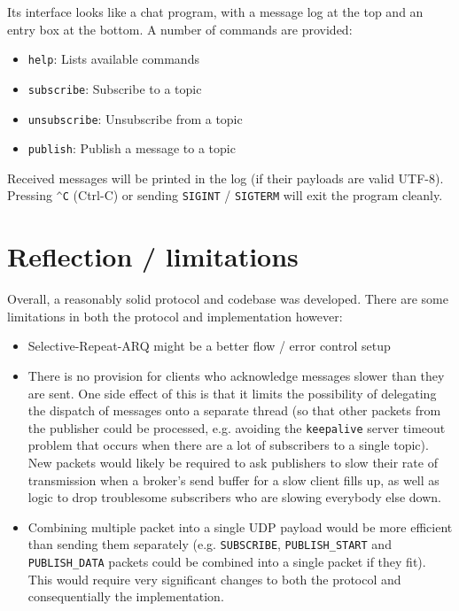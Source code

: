 \documentclass[a4paper]{article}
\numberwithin{figure}{section}
\numberwithin{table}{section}
\newcommand{\mi}{\mintinline}
\begin{document}
Its interface looks like a chat program, with a message log at the top and an entry box at the bottom. A number of commands are provided:
\begin{itemize}
	\item \mi{c}{help}: Lists available commands
	\item \mi{c}{subscribe}: Subscribe to a topic
	\item \mi{c}{unsubscribe}: Unsubscribe from a topic
	\item \mi{c}{publish}: Publish a message to a topic
\end{itemize}

Received messages will be printed in the log (if their payloads are valid UTF-8). Pressing \mi{c}{^C} (Ctrl-C) or sending \mi{c}{SIGINT} / \mi{c}{SIGTERM} will exit the program cleanly.

\section{Reflection / limitations}
Overall, a reasonably solid protocol and codebase was developed. There are some limitations in both the protocol and implementation however:
\begin{itemize}
	\item Selective-Repeat-ARQ might be a better flow / error control setup
	\item There is no provision for clients who acknowledge messages slower than they are sent. One side effect of this is that it limits the possibility of delegating the dispatch of messages onto a separate thread (so that other packets from the publisher could be processed, e.g. avoiding the \mi{c}{keepalive} server timeout problem that occurs when there are a lot of subscribers to a single topic). New packets would likely be required to ask publishers to slow their rate of transmission when a broker's send buffer for a slow client fills up, as well as logic to drop troublesome subscribers who are slowing everybody else down.
	\item Combining multiple packet into a single UDP payload would be more efficient than sending them separately (e.g. \mi{c}{SUBSCRIBE}, \mi{c}{PUBLISH_START} and \mi{c}{PUBLISH_DATA} packets could be combined into a single packet if they fit). This would require very significant changes to both the protocol and consequentially the implementation.
\end{itemize}

\clearpage
{}
{}
\printbibliography
\end{document}
